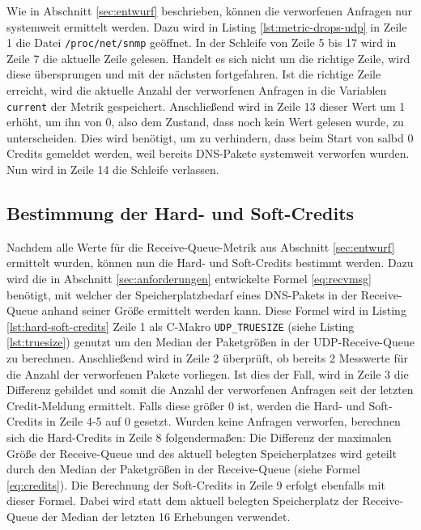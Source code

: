 \documentclass[a4paper, 12pt, BCOR10mm, DIV12, toc=bibliography, toc=listof, german]{scrbook}
\begin{document}
				Wie in Abschnitt \ref{sec:entwurf} beschrieben, können die verworfenen Anfragen nur
				systemweit ermittelt werden. Dazu wird in Listing \ref{lst:metric-drops-udp} in Zeile 1 die
				Datei \texttt{/proc/net/snmp} geöffnet. In der Schleife von Zeile 5 bis 17 wird in Zeile 7
				die aktuelle Zeile gelesen. Handelt es sich nicht um die richtige Zeile, wird diese
				übersprungen und mit der nächsten fortgefahren. Ist die richtige Zeile erreicht, wird die
				aktuelle Anzahl der verworfenen Anfragen in die Variablen \texttt{current} der Metrik
				gespeichert. Anschließend wird in Zeile 13 dieser Wert um 1 erhöht, um ihn von 0, also dem
				Zustand, dass noch kein Wert gelesen wurde, zu unterscheiden. Dies wird benötigt, um zu
				verhindern, dass beim Start von salbd 0 Credits gemeldet werden, weil bereits DNS-Pakete
				systemweit verworfen wurden. Nun wird in Zeile 14 die Schleife verlassen.

			



			\subsection*{Bestimmung der Hard- und Soft-Credits} %

			Nachdem alle Werte für die Receive-Queue-Metrik aus Abschnitt \ref{sec:entwurf} ermittelt
			wurden, können nun die Hard- und Soft-Credits bestimmt werden. Dazu wird die in Abschnitt
			\ref{sec:anforderungen} entwickelte Formel \ref{eq:recvmsg} benötigt, mit welcher der
			Speicherplatzbedarf eines DNS-Pakets in der Receive-Queue anhand seiner Größe ermittelt werden
			kann. Diese Formel wird in Listing \ref{lst:hard-soft-credits} Zeile 1 als C-Makro
			\texttt{UDP\_TRUESIZE} (siehe Listing \ref{lst:truesize}) genutzt um den Median der
			Paketgrößen in der UDP-Receive-Queue zu berechnen. Anschließend wird in Zeile 2 überprüft, ob
			bereits 2 Messwerte für die Anzahl der verworfenen Pakete vorliegen. Ist dies der Fall, wird
			in Zeile 3 die Differenz gebildet und somit die Anzahl der verworfenen Anfragen seit der
			letzten Credit-Meldung ermittelt. Falls diese größer 0 ist, werden die Hard- und Soft-Credits
			in Zeile 4-5 auf 0 gesetzt. Wurden keine Anfragen verworfen, berechnen sich die Hard-Credits
			in Zeile 8 folgendermaßen: Die Differenz der maximalen Größe der Receive-Queue und des aktuell
			belegten Speicherplatzes wird geteilt durch den Median der Paketgrößen in der Receive-Queue
			(siehe Formel \ref{eq:credits}).  Die Berechnung der Soft-Credits in Zeile 9 erfolgt ebenfalls
			mit dieser Formel. Dabei wird statt dem aktuell belegten Speicherplatz der Receive-Queue der
			Median der letzten 16 Erhebungen verwendet.
\end{document}
